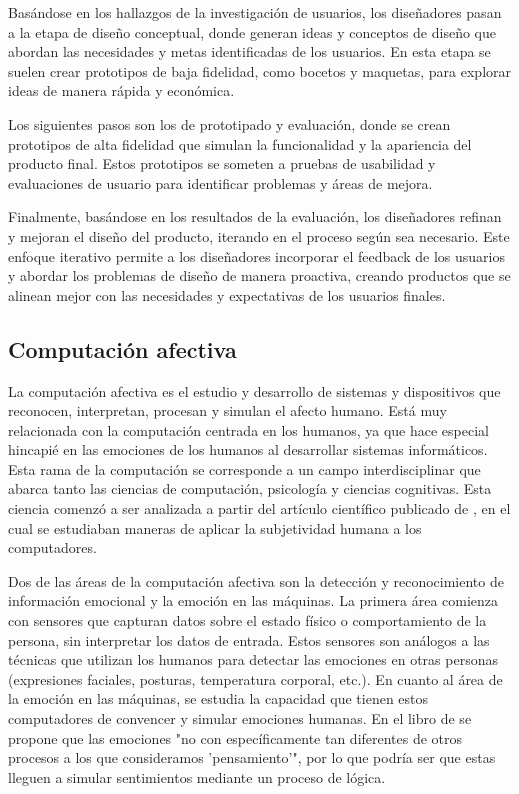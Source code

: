 Basándose en los hallazgos de la investigación de usuarios, los diseñadores pasan a la etapa de diseño conceptual, donde generan ideas y conceptos de diseño que abordan las necesidades y metas identificadas de los usuarios. En esta etapa se suelen crear prototipos de baja fidelidad, como bocetos y maquetas, para explorar ideas de manera rápida y económica.

Los siguientes pasos son los de prototipado y evaluación, donde se crean prototipos de alta fidelidad que simulan la funcionalidad y la apariencia del producto final. Estos prototipos se someten a pruebas de usabilidad y evaluaciones de usuario para identificar problemas y áreas de mejora.

Finalmente, basándose en los resultados de la evaluación, los diseñadores refinan y mejoran el diseño del producto, iterando en el proceso según sea necesario. Este enfoque iterativo permite a los diseñadores incorporar el feedback de los usuarios y abordar los problemas de diseño de manera proactiva, creando productos que se alinean mejor con las necesidades y expectativas de los usuarios finales.

\subsection{Computación afectiva}

La computación afectiva es el estudio y desarrollo de sistemas y dispositivos que reconocen, interpretan, procesan y simulan el afecto humano. Está muy relacionada con la computación centrada en los humanos, ya que hace especial hincapié en las emociones de los humanos al desarrollar sistemas informáticos. Esta rama de la computación se corresponde a un campo interdisciplinar que abarca tanto las ciencias de computación, psicología y ciencias cognitivas. Esta ciencia comenzó a ser analizada a partir del artículo científico publicado de \cite{picard1995computer}, en el cual se estudiaban maneras de aplicar la subjetividad humana a los computadores.

Dos de las áreas de la computación afectiva son la detección y reconocimiento de información emocional y la emoción en las máquinas. La primera área comienza con sensores que capturan datos sobre el estado físico o comportamiento de la persona, sin interpretar los datos de entrada. Estos sensores son análogos a las técnicas que utilizan los humanos para detectar las emociones en otras personas (expresiones faciales, posturas, temperatura corporal, etc.). En cuanto al área de la emoción en las máquinas, se estudia la capacidad que tienen estos computadores de convencer y simular emociones humanas. En el libro de \cite{minsky2007emotion} se propone que las emociones "no con específicamente tan diferentes de otros procesos a los que consideramos 'pensamiento'", por lo que podría ser que estas lleguen a simular sentimientos mediante un proceso de lógica.

